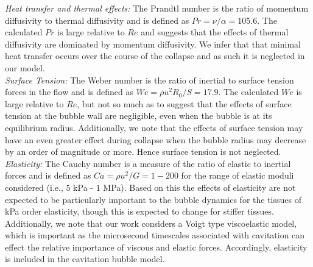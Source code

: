 \noindent\textit{Heat transfer and thermal effects:} The Prandtl
number is the ratio of momentum diffusivity to thermal diffusivity and
is defined as $Pr = \nu/\alpha = 105.6$. The calculated $Pr$ is large
relative to $Re$ and suggests that the effects of thermal diffusivity
are dominated by momentum diffusivity. We infer that that minimal heat
transfer occurs over the course of the collapse and as such it is neglected in our model.\\

\noindent\textit{Surface Tension:} The Weber number is the ratio of inertial to
surface tension forces in the flow and is defined as
$We = \rho u^2 R_0/S = 17.9$. The calculated $We$ is large relative to
$Re$, but not so much as to suggest that the effects of surface
tension at the bubble wall are negligible, even when the bubble is at its
equilibrium radius. Additionally, we note that the effects of surface
tension may have an even greater effect during collapse when the
bubble radius may decrease by an order of magnitude
or more. Hence surface tension is not neglected.\\

\noindent\textit{Elasticity:} The Cauchy number is a measure of the
ratio of elastic to inertial forces and is defined as
$Ca = \rho u^2 / G = 1 - 200$ for the range of elastic moduli
considered (i.e., $5$ kPa - $1$ MPa). Based on this the effects of
elasticity are not expected to be particularly important to the bubble
dynamics for the tissues of kPa order elasticity, though this is
expected to change for stiffer tissues. Additionally, we note that our
work considers a Voigt type viscoelastic model, which is important as
the microsecond timescales associated with cavitation can effect the
relative importance of viscous and elastic forces. Accordingly, elasticity is included in the cavitation bubble model.\\

